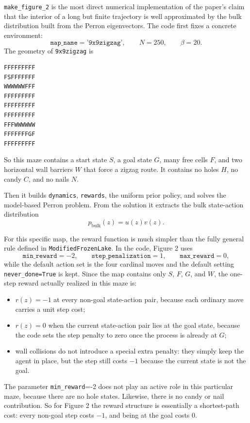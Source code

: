 \documentclass[11pt]{article}
\begin{document}
\medskip
\texttt{make\_figure\_2} is the most direct numerical implementation of the paper's claim that
the interior of a long but finite trajectory is well approximated by the bulk distribution
built from the Perron eigenvectors. The code first fixes a concrete environment:
\begin{equation}
    \texttt{map\_name} = \texttt{'9x9zigzag'},
    \qquad
    N = 250,
    \qquad
    \beta = 20.
\end{equation}
The geometry of \texttt{9x9zigzag} is
\begin{verbatim}
FFFFFFFFF
FSFFFFFFF
WWWWWWFFF
FFFFFFFFF
FFFFFFFFF
FFFFFFFFF
FFFWWWWWW
FFFFFFFGF
FFFFFFFFF
\end{verbatim}
So this maze contains a start state \(S\), a goal state \(G\), many free cells \(F\), and two
horizontal wall barriers \(W\) that force a zigzag route. It contains no holes \(H\), no candy
\(C\), and no nails \(N\).

Then it builds \texttt{dynamics}, \texttt{rewards}, the uniform prior policy, and solves the
model-based Perron problem. From the solution it extracts the bulk state-action distribution
\begin{equation}
    p_{\mathrm{bulk}}(z) = u(z)v(z).
\end{equation}

For this specific map, the reward function is much simpler than the fully general rule defined
in \texttt{ModifiedFrozenLake}. In the code, Figure 2 uses
\begin{equation}
    \texttt{min\_reward}=-2,
    \qquad
    \texttt{step\_penalization}=1,
    \qquad
    \texttt{max\_reward}=0,
\end{equation}
while the default action set is the four cardinal moves and the default setting
\texttt{never\_done=True} is kept. Since the map contains only \(S\), \(F\), \(G\), and \(W\),
the one-step reward actually realized in this maze is:
\begin{itemize}
    \item \(r(z)=-1\) at every non-goal state-action pair, because each ordinary move carries a
    unit step cost;
    \item \(r(z)=0\) when the current state-action pair lies at the goal state, because the
    code sets the step penalty to zero once the process is already at \(G\);
    \item wall collisions do not introduce a special extra penalty: they simply keep the agent
    in place, but the step still costs \(-1\) because the current state is not the goal.
\end{itemize}
The parameter \texttt{min\_reward}=-2 does not play an active role in this particular maze,
because there are no hole states. Likewise, there is no candy or nail contribution. So for
Figure 2 the reward structure is essentially a shortest-path cost: every non-goal step costs
\(-1\), and being at the goal costs \(0\).
\end{document}
